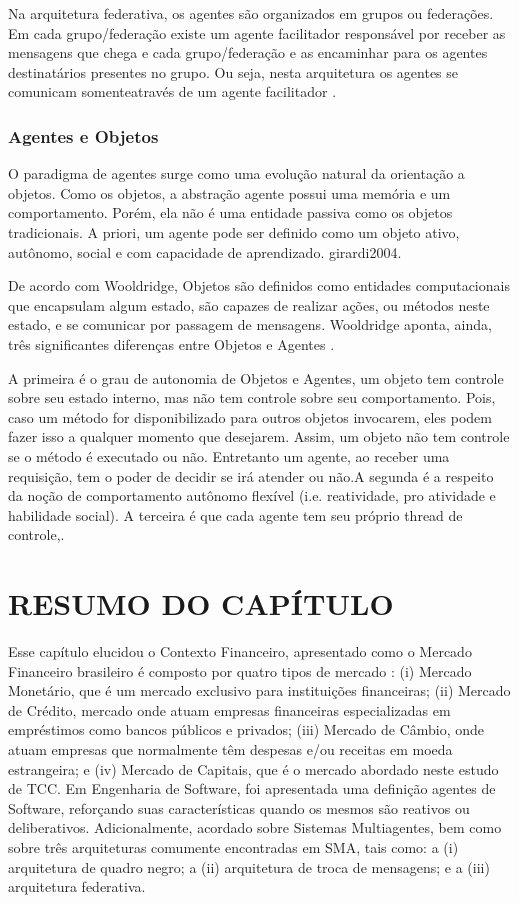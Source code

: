 Na arquitetura federativa, os agentes são organizados em grupos ou federações. Em cada grupo/federação existe um agente facilitador responsável por receber as mensagens que chega e cada grupo/federação e as encaminhar para os agentes destinatários presentes no grupo. Ou seja, nesta arquitetura os agentes se comunicam somenteatravés de um agente facilitador \cite[p. 8]{girardi2004}.


\subsubsection{Agentes e Objetos}

O paradigma de agentes surge como uma evolução natural da orientação a objetos. Como os objetos, a abstração agente possui uma memória e um comportamento. Porém, ela não é uma entidade passiva como os objetos tradicionais. A priori, um agente pode ser definido como um objeto ativo, autônomo, social e com capacidade de aprendizado. 
\newline {} {girardi2004}.


De acordo com Wooldridge, Objetos são definidos como entidades computacionais que encapsulam algum estado, são capazes de realizar ações, ou métodos neste estado, e se comunicar por passagem de mensagens. Wooldridge aponta, ainda, três significantes diferenças entre Objetos e Agentes \cite[p. 25-27]{wooldrige2002}. 

A primeira é o grau de autonomia de Objetos e Agentes, um objeto tem controle sobre seu estado interno, mas não tem controle sobre seu comportamento. Pois, caso um método for disponibilizado para outros objetos invocarem, eles podem fazer isso a qualquer momento que desejarem. Assim, um objeto não tem controle se o método é executado ou não. Entretanto um agente, ao receber uma requisição, tem o poder de decidir se irá atender ou não.A segunda é a respeito da noção de comportamento autônomo flexível (i.e. reatividade, pro atividade e habilidade social). A terceira é que cada agente tem seu próprio thread de controle,\cite[p. 25-27]{wooldrige2002}.


\section{RESUMO DO CAPÍTULO}

Esse capítulo elucidou o Contexto Financeiro, apresentado como o Mercado Financeiro brasileiro é composto por quatro tipos de mercado \cite[p. 15]{cmv2014}: (i) Mercado Monetário, que é um mercado exclusivo para instituições financeiras; (ii) Mercado de Crédito, mercado onde atuam empresas financeiras especializadas em empréstimos como bancos públicos e privados; (iii) Mercado de Câmbio, onde atuam empresas que normalmente têm despesas e/ou receitas em moeda estrangeira; e (iv) Mercado de Capitais, que é o mercado abordado neste estudo de TCC. Em Engenharia de Software, foi apresentada uma definição agentes de Software, reforçando suas características quando os mesmos são reativos ou deliberativos. Adicionalmente, acordado sobre Sistemas Multiagentes, bem como sobre três arquiteturas comumente encontradas em SMA, tais como: a (i) arquitetura de quadro negro; a (ii) arquitetura de troca de mensagens; e a (iii) arquitetura federativa.
\newpage
